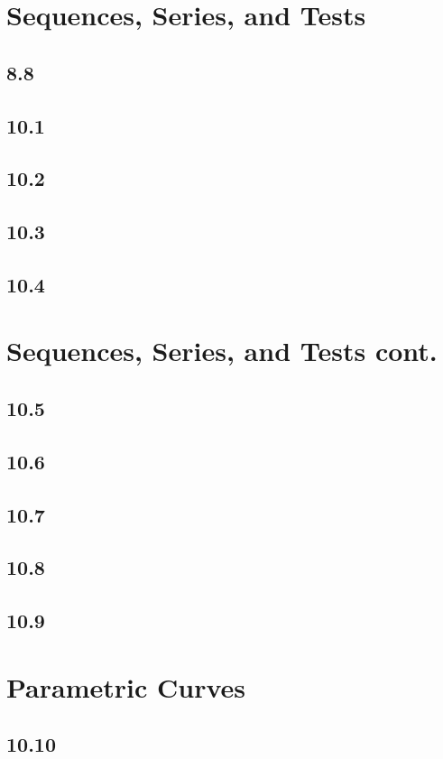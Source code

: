 \documentclass{article}
\begin{document}
    \section{Sequences, Series, and Tests}
        \subsection*{8.8}
        \subsection*{10.1}
        \subsection*{10.2}
        \subsection*{10.3}
        \subsection*{10.4}
    \section{Sequences, Series, and Tests cont.}
        \subsection*{10.5}
        \subsection*{10.6}
        \subsection*{10.7}
        \subsection*{10.8}
        \subsection*{10.9}
    \section{Parametric Curves}
        \subsection*{10.10}
        \color{OliveGreen}
\end{document}
